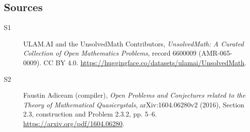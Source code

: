 \documentclass[11pt]{article}
\begin{document}
\subsection{Sources}
\begin{description}
\item[\hypertarget{source:6600009:1}{S1}] ULAM.AI and the UnsolvedMath Contributors, \emph{UnsolvedMath: A Curated Collection of Open Mathematics Problems}, record 6600009 (AMR-065-0009). CC BY 4.0. \url{https://huggingface.co/datasets/ulamai/UnsolvedMath}.
\item[\hypertarget{source:6600009:2}{S2}] Faustin Adiceam (compiler), \emph{Open Problems and Conjectures related to the Theory of Mathematical Quasicrystals}, arXiv:1604.06280v2 (2016), Section 2.3, construction and Problem 2.3.2, pp. 5--6. \url{https://arxiv.org/pdf/1604.06280}.
\end{description}
\label{end:6600009}
\end{document}
